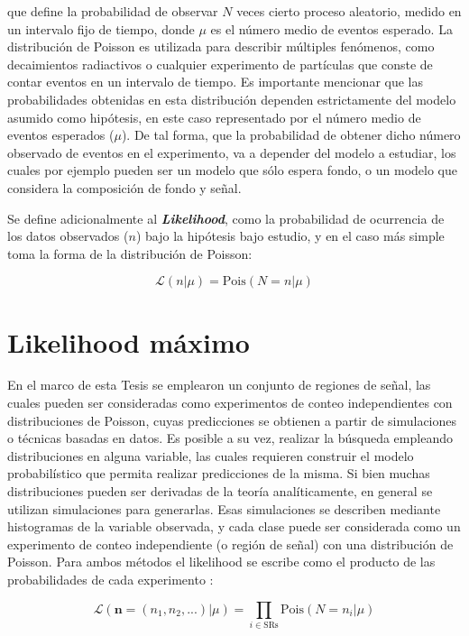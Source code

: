 \noindent
que define la probabilidad de observar $N$ veces cierto proceso aleatorio, medido en un intervalo fijo de tiempo, donde $\mu$ es el número medio de eventos esperado. La distribución de Poisson es utilizada para describir múltiples fenómenos, como decaimientos radiactivos o cualquier experimento de partículas que conste de contar eventos en un intervalo de tiempo. Es importante mencionar que las probabilidades obtenidas en esta distribución dependen estrictamente del modelo asumido como hipótesis, en este caso representado por el número medio de eventos esperados ($\mu$). De tal forma, que la probabilidad de obtener dicho número observado de eventos en el experimento, va a depender del modelo a estudiar, los cuales por ejemplo pueden ser un modelo que sólo espera fondo, o un modelo que considera la composición de fondo y señal. 

Se define adicionalmente al \textbf{\textit{Likelihood}}, como la probabilidad de ocurrencia de los datos observados ($n$) bajo la hipótesis bajo estudio, y en el caso más simple toma la forma de la distribución de Poisson:

\begin{equation}
	\mathcal{L}(n|\mu) = \text{Pois}(N=n|\mu) 
\end{equation}

\section{Likelihood máximo}

En el marco de esta Tesis se emplearon un conjunto de regiones de señal, las cuales pueden ser consideradas como experimentos de conteo independientes con distribuciones de Poisson, cuyas predicciones se obtienen a partir de simulaciones o técnicas basadas en datos. 
Es posible a su vez, realizar la búsqueda empleando distribuciones en alguna variable, las cuales requieren construir el modelo probabilístico que permita realizar predicciones de la misma. Si bien muchas distribuciones pueden ser derivadas de la teoría analíticamente, en general se utilizan simulaciones para generarlas. Esas simulaciones se describen mediante histogramas de la variable observada, y cada clase puede ser considerada como un experimento de conteo independiente (o región de señal) con una distribución de Poisson. 
Para ambos métodos el likelihood se escribe como el producto de las probabilidades de cada experimento \cite{cowan_book}:


\begin{equation}
	\mathcal{L}(\textbf{n}=(n_1,n_2,...)|\mu) = \prod_{i\in \text{SRs}} \text{Pois}(N=n_i|\mu) 
\end{equation}


